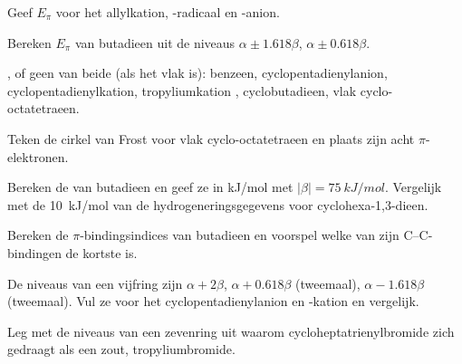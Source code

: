 \begin{exercise}[$\star$]\label{exo:b2:huckel:1}
Geef $E_\pi$ voor het allylkation, -radicaal en -anion.
\end{exercise}

\begin{exercise}[$\star$]\label{exo:b2:huckel:2}
Bereken $E_\pi$ van butadieen uit de niveaus $\alpha \pm 1.618\beta$, $\alpha \pm 0.618\beta$.
\end{exercise}

\begin{exercise}[$\star$]\label{exo:b2:huckel:3}
,  of geen van beide (als het vlak is): benzeen, cyclopentadienylanion,
cyclopentadienylkation, tropyliumkation , cyclobutadieen, vlak
cyclo-octatetraeen.
\end{exercise}

\begin{exercise}[$\star$]\label{exo:b2:huckel:4}
Teken de cirkel van Frost voor vlak cyclo-octatetraeen en plaats zijn acht $\pi$-elektronen.
\end{exercise}

\begin{exercise}[$\star\star$]\label{exo:b2:huckel:5}
Bereken de  van butadieen en geef ze in \unit{kJ/mol} met
$|\beta| = \qty{75}{kJ/mol}$. Vergelijk met de \qty{10}{kJ/mol} van de hydrogeneringsgegevens
voor cyclohexa-1,3-dieen.
\end{exercise}

\begin{exercise}[$\star\star$]\label{exo:b2:huckel:6}
Bereken de $\pi$-bindingsindices van butadieen en voorspel welke van zijn C--C-bindingen de
kortste is.
\end{exercise}

\begin{exercise}[$\star\star$]\label{exo:b2:huckel:7}
De niveaus van een vijfring zijn $\alpha + 2\beta$, $\alpha + 0.618\beta$ (tweemaal),
$\alpha - 1.618\beta$ (tweemaal). Vul ze voor het cyclopentadienylanion en -kation en
vergelijk.
\end{exercise}

\begin{exercise}[$\star\star$]\label{exo:b2:huckel:8}
Leg met de niveaus van een zevenring uit waarom cycloheptatrienylbromide
zich gedraagt als een zout, tropyliumbromide.
\end{exercise}

